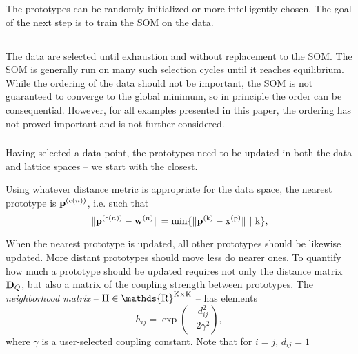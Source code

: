 \documentclass[fleqn,usenatbib]{mnras}
\begin{document}
      The prototypes can be randomly initialized or more intelligently chosen.
      The goal of the next step is to train the SOM on the data.

    \subsection*{}

      \subsubsection*{}

        The data are selected until exhaustion and without replacement to the
        SOM. The SOM is generally run on many such selection cycles until it
        reaches equilibrium. While the ordering of the data should not be
        important, the SOM is not guaranteed to converge to the global minimum,
        so in principle the order can be consequential. However, for all
        examples presented in this paper, the ordering has not proved important
        and is not further considered.


      \subsubsection*{}

        Having selected a data point, the prototypes need to be updated in both
        the data and lattice spaces -- we start with the closest.

        Using whatever distance metric is appropriate for the data space, the
        nearest prototype is $\mathbf{p}^{(c(n))}$, i.e. such that
        \begin{equation} \label{eq:app:som_BMU}
            \lVert \mathbf{p}^{(c(n))} - \mathbf{w}^{(n)} \rVert = \rm{min}\{\lVert \mathbf{p}^{(k)} - x^{(p)} \rVert \ | \ k \},
        \end{equation}

        When the nearest prototype is updated, all other prototypes should be
        likewise updated. More distant prototypes should move less do nearer
        ones. To quantify how much a prototype should be updated requires not
        only the distance matrix $\mathbf{D}_Q$, but also a matrix of the coupling
        strength between prototypes. The \textit{neighborhood matrix} -- $\rm{H}
        \in \mathds{R}^{K \times K}$ -- has elements
        \begin{equation}
            h_{ij} = \exp\left(-\frac{d_{ij}^2}{2\gamma^2}\right),
        \end{equation}
        where $\gamma$ is a user-selected coupling constant. Note that for
        $i=j$, $d_{ij}=1$
\end{document}
